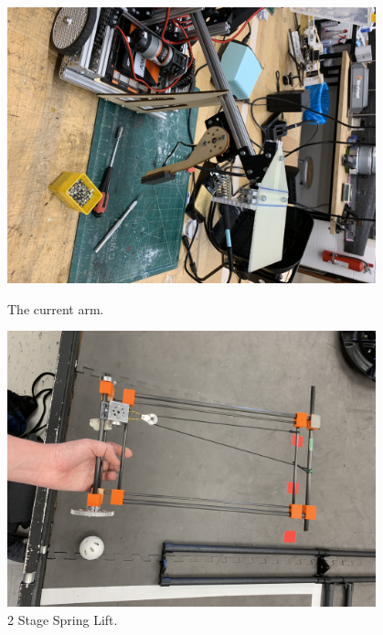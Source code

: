  

\begin{figure}[ht]
\centering
\begin{minipage}[b]{.48\textwidth}
  \centering
  \includegraphics[width=0.95\textwidth]{Meetings/October/10-28-21/10-28-21_Hardware_Figure1 - Nathan Forrer.JPG}
  \caption{The current arm.}
  \label{fig:102821_1}
\end{minipage}%
\hfill%
\begin{minipage}[b]{.48\textwidth}
  \centering
  \includegraphics[width=0.95\textwidth]{Meetings/October/10-28-21/10-28-21_Hardware_Figure2 - Nathan Forrer.JPG}
  \caption{2 Stage Spring Lift.}
  \label{fig:102821_2}
\end{minipage}
\end{figure}

